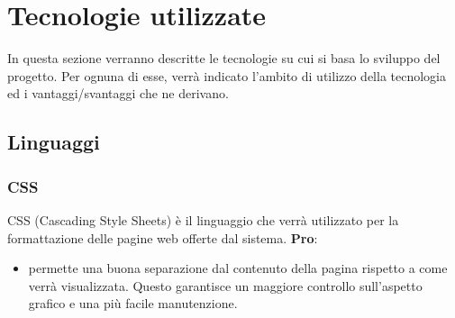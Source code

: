 %


\section{Tecnologie utilizzate} %
\label{sec:tecnologie_utilizzate}
In questa sezione verranno descritte le tecnologie su cui si basa lo sviluppo del progetto. Per ognuna di esse, verrà indicato l’ambito di utilizzo della tecnologia ed i vantaggi/svantaggi che ne derivano.

	\subsection{Linguaggi} %
	\label{sub:linguaggi}
		\subsubsection{CSS} %
		\label{ssub:css}
		CSS (Cascading Style Sheets) è il linguaggio che verrà utilizzato per la formattazione delle pagine web offerte dal sistema. \newline
		\textbf{Pro}:
			\begin{itemize}
				\item permette una buona separazione dal contenuto della pagina rispetto a come verrà visualizzata. Questo garantisce un maggiore controllo sull'aspetto grafico e una più facile manutenzione.
			\end{itemize}


